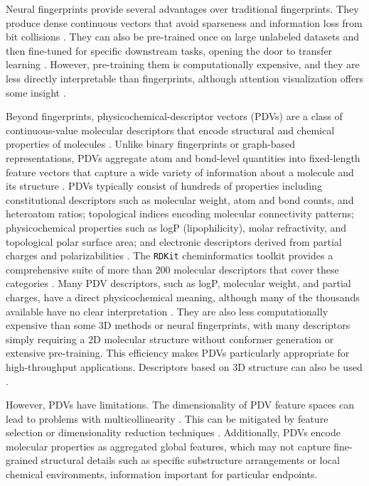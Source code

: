 Neural fingerprints provide several advantages over traditional fingerprints. They produce dense continuous vectors that avoid sparseness and information loss from bit collisions \citep{Jaeger2018}. They can also be pre-trained once on large unlabeled datasets and then fine-tuned for specific downstream tasks, opening the door to transfer learning \citep{Chithrananda2020, Fabian2020}. However, pre-training them is computationally expensive, and they are less directly interpretable than fingerprints, although attention visualization offers some insight \citep{Chithrananda2020}.

Beyond fingerprints, physicochemical-descriptor vectors (PDVs) are a class of continuous-value molecular descriptors that encode structural and chemical properties of molecules \citep{Todeschini2009}. Unlike binary fingerprints or graph-based representations, PDVs aggregate atom and bond-level quantities into fixed-length feature vectors that capture a wide variety of information about a molecule and its structure \citep{Mauri2006}. PDVs typically consist of hundreds of properties including constitutional descriptors such as molecular weight, atom and bond counts, and heteroatom ratios; topological indices encoding molecular connectivity patterns; physicochemical properties such as logP (lipophilicity), molar refractivity, and topological polar surface area; and electronic descriptors derived from partial charges and polarizabilities \citep{Todeschini2009, Cherkasov2014}. The \texttt{RDKit} cheminformatics toolkit provides a comprehensive suite of more than 200 molecular descriptors that cover these categories \citep{rdkit}. Many PDV descriptors, such as logP, molecular weight, and partial charges, have a direct physicochemical meaning, although many of the thousands available have no clear interpretation \citep{Cherkasov2014}. They are also less computationally expensive than some 3D methods or neural fingerprints, with many descriptors simply requiring a 2D molecular structure without conformer generation or extensive pre-training. This efficiency makes PDVs particularly appropriate for high-throughput applications. Descriptors based on 3D structure can also be used \citep{Mauri2006}.

However, PDVs have limitations. The dimensionality of PDV feature spaces can lead to problems with multicollinearity \citep{Todeschini2009}. This can be mitigated by feature selection or dimensionality reduction techniques \citep{Guyon2003, Jolliffe2016}. Additionally, PDVs encode molecular properties as aggregated global features, which may not capture fine-grained structural details such as specific substructure arrangements or local chemical environments, information important for particular endpoints.

